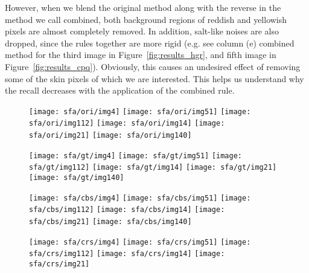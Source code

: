 However, when we blend the original method along with the reverse in the method we call combined, both background regions of reddish and yellowish pixels are almost completely removed. In addition, salt-like noises are also dropped, since the rules together are more rigid (e.g. see column (e) combined method for the third image in Figure~\ref{fig:results_hgr}, and fifth image in Figure~\ref{fig:results_cpq}). Obviously, this causes an undesired effect of removing some of the skin pixels of which we are interested. This helps us understand why the recall decreases with the application of the combined rule.

\clearpage
\begin{figure*}[!htb]
    \centering
    \begin{subfigure}[t]{0.15\textwidth}
        \texttt{[image: sfa/ori/img4]}
        \texttt{[image: sfa/ori/img51]}
        \texttt{[image: sfa/ori/img112]}
        \texttt{[image: sfa/ori/img14]}
        \texttt{[image: sfa/ori/img21]}
        \texttt{[image: sfa/ori/img140]}
        \caption{}
    \end{subfigure}
    \begin{subfigure}[t]{0.15\textwidth}
        \texttt{[image: sfa/gt/img4]}
        \texttt{[image: sfa/gt/img51]}
        \texttt{[image: sfa/gt/img112]}
        \texttt{[image: sfa/gt/img14]}
        \texttt{[image: sfa/gt/img21]}
        \texttt{[image: sfa/gt/img140]}
        \caption{}
    \end{subfigure}
    \begin{subfigure}[t]{0.15\textwidth}
        \texttt{[image: sfa/cbs/img4]}
        \texttt{[image: sfa/cbs/img51]}
        \texttt{[image: sfa/cbs/img112]}
        \texttt{[image: sfa/cbs/img14]}
        \texttt{[image: sfa/cbs/img21]}
        \texttt{[image: sfa/cbs/img140]}
        \caption{}
    \end{subfigure}
    \begin{subfigure}[t]{0.15\textwidth}
        \texttt{[image: sfa/crs/img4]}
        \texttt{[image: sfa/crs/img51]}
        \texttt{[image: sfa/crs/img112]}
        \texttt{[image: sfa/crs/img14]}
        \texttt{[image: sfa/crs/img21]}

\end{subfigure}
\end{figure*}
